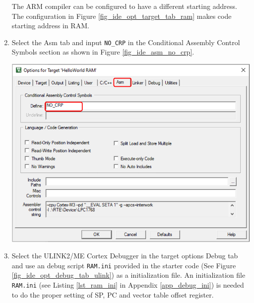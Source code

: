 \begin{enumerate}
        The ARM compiler can be configured to have a different starting address. The configuration in Figure \ref{fig_ide_opt_target_tab_ram} makes code starting address in RAM.

        \item Select the Asm tab and input \verb+NO_CRP+ in the Conditional Assembly Control Symbols section as shown in Figure \ref{fig_ide_asm_no_crp}. \par

          \begin{minipage}{\linewidth}
            \centering
            \includegraphics[width=5in]{figure/uv5/IDE_asm_no_crp}
            \label{fig_ide_asm_no_crp}
          \end{minipage}

        \item Select the ULINK2/ME Cortex Debugger in the target options Debug tab and use an debug script \verb+RAM.ini+ provided in the starter code (See Figure \ref{fig_ide_opt_debug_tab_ulink}) as a initialization file.
An initialization file \verb+RAM.ini+ (see Listing \ref{lst_ram_ini} in Appendix \ref{app_debug_ini}) is needed to do the proper setting of SP, PC and vector table offset register. \par


\end{enumerate}
